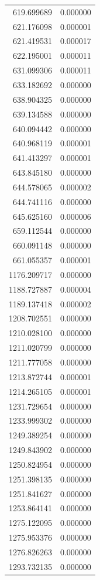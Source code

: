 \begin{longtable}{rr}
619.699689 & 0.000000 \\
621.176098 & 0.000001 \\
621.419531 & 0.000017 \\
622.195001 & 0.000011 \\
631.099306 & 0.000011 \\
633.182692 & 0.000000 \\
638.904325 & 0.000000 \\
639.134588 & 0.000000 \\
640.094442 & 0.000000 \\
640.968119 & 0.000001 \\
641.413297 & 0.000001 \\
643.845180 & 0.000000 \\
644.578065 & 0.000002 \\
644.741116 & 0.000000 \\
645.625160 & 0.000006 \\
659.112544 & 0.000000 \\
660.091148 & 0.000000 \\
661.055357 & 0.000001 \\
1176.209717 & 0.000000 \\
1188.727887 & 0.000004 \\
1189.137418 & 0.000002 \\
1208.702551 & 0.000000 \\
1210.028100 & 0.000000 \\
1211.020799 & 0.000000 \\
1211.777058 & 0.000000 \\
1213.872744 & 0.000001 \\
1214.265105 & 0.000001 \\
1231.729654 & 0.000000 \\
1233.999302 & 0.000000 \\
1249.389254 & 0.000000 \\
1249.843902 & 0.000000 \\
1250.824954 & 0.000000 \\
1251.398135 & 0.000000 \\
1251.841627 & 0.000000 \\
1253.864141 & 0.000000 \\
1275.122095 & 0.000000 \\
1275.953376 & 0.000000 \\
1276.826263 & 0.000000 \\
1293.732135 & 0.000000 \\
\end{longtable}
